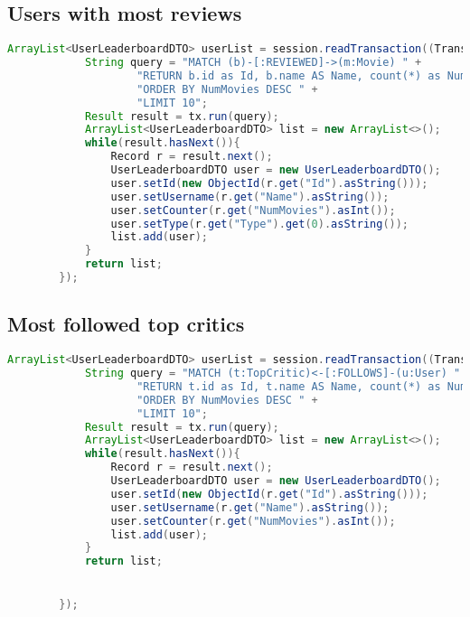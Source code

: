 \subsection{Users with most reviews}
\begin{lstlisting}[language = Java, caption = mostActiveUser]
ArrayList<UserLeaderboardDTO> userList = session.readTransaction((TransactionWork<ArrayList<UserLeaderboardDTO>>) tx ->{
            String query = "MATCH (b)-[:REVIEWED]->(m:Movie) " +
                    "RETURN b.id as Id, b.name AS Name, count(*) as NumMovies, labels(b) as Type " +
                    "ORDER BY NumMovies DESC " +
                    "LIMIT 10";
            Result result = tx.run(query);
            ArrayList<UserLeaderboardDTO> list = new ArrayList<>();
            while(result.hasNext()){
                Record r = result.next();
                UserLeaderboardDTO user = new UserLeaderboardDTO();
                user.setId(new ObjectId(r.get("Id").asString()));
                user.setUsername(r.get("Name").asString());
                user.setCounter(r.get("NumMovies").asInt());
                user.setType(r.get("Type").get(0).asString());
                list.add(user);
            }
            return list;
        });
\end{lstlisting}

\subsection{Most followed top critics}
\begin{lstlisting}[language = Java, caption = mostFollowTopCritic]
ArrayList<UserLeaderboardDTO> userList = session.readTransaction((TransactionWork<ArrayList<UserLeaderboardDTO>>) tx ->{
            String query = "MATCH (t:TopCritic)<-[:FOLLOWS]-(u:User) " +
                    "RETURN t.id as Id, t.name AS Name, count(*) as NumMovies " +
                    "ORDER BY NumMovies DESC " +
                    "LIMIT 10";
            Result result = tx.run(query);
            ArrayList<UserLeaderboardDTO> list = new ArrayList<>();
            while(result.hasNext()){
                Record r = result.next();
                UserLeaderboardDTO user = new UserLeaderboardDTO();
                user.setId(new ObjectId(r.get("Id").asString()));
                user.setUsername(r.get("Name").asString());
                user.setCounter(r.get("NumMovies").asInt());
                list.add(user);
            }
            return list;


        });
\end{lstlisting}


